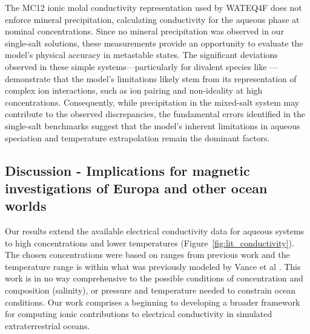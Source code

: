 \documentclass[journal=aesccq,manuscript=article]{achemso}
\begin{document}
The MC12 ionic molal conductivity representation \citep{McCleskey2012} used by WATEQ4F does not enforce mineral precipitation, calculating conductivity for the aqueous phase at nominal concentrations. Since no mineral precipitation was observed in our single-salt solutions, these measurements provide an opportunity to evaluate the model's physical accuracy in metastable states. The significant deviations observed in these simple systems—particularly for divalent species like —demonstrate that the model's limitations likely stem from its representation of complex ion interactions, such as ion pairing and non-ideality at high concentrations. Consequently, while precipitation in the mixed-salt system may contribute to the observed discrepancies, the fundamental errors identified in the single-salt benchmarks suggest that the model's inherent limitations in aqueous speciation and temperature extrapolation remain the dominant factors.

\subsection{Discussion - Implications for magnetic investigations of Europa and other ocean worlds}\label{sec:discussion}

Our results extend the available electrical conductivity data for aqueous systems to high concentrations and lower temperatures (Figure~\ref{fig:lit_conductivity}).
The chosen concentrations were based on ranges from previous work and the temperature range is within what was previously modeled by Vance et al \cite{vance2018geophysical}. This work is in no way comprehensive to the possible conditions of concentration and composition (salinity), or pressure and temperature needed to constrain ocean conditions. 
Our work comprises a beginning to developing a broader framework for computing ionic contributions to electrical conductivity in simulated extraterrestrial oceans\citep{vance2021magnetic}. 
\end{document}
